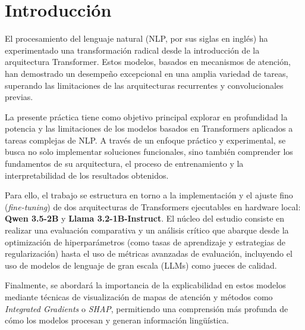 \section{Introducción}

El procesamiento del lenguaje natural (NLP, por sus siglas en inglés) ha experimentado una transformación radical desde la introducción de la arquitectura Transformer. Estos modelos, basados en mecanismos de atención, han demostrado un desempeño excepcional en una amplia variedad de tareas, superando las limitaciones de las arquitecturas recurrentes y convolucionales previas.

La presente práctica tiene como objetivo principal explorar en profundidad la potencia y las limitaciones de los modelos basados en Transformers aplicados a tareas complejas de NLP. A través de un enfoque práctico y experimental, se busca no solo implementar soluciones funcionales, sino también comprender los fundamentos de su arquitectura, el proceso de entrenamiento y la interpretabilidad de los resultados obtenidos.

Para ello, el trabajo se estructura en torno a la implementación y el ajuste fino (\textit{fine-tuning}) de dos arquitecturas de Transformers ejecutables en hardware local: \textbf{Qwen 3.5-2B} y \textbf{Llama 3.2-1B-Instruct}. El núcleo del estudio consiste en realizar una evaluación comparativa y un análisis crítico que abarque desde la optimización de hiperparámetros (como tasas de aprendizaje y estrategias de regularización) hasta el uso de métricas avanzadas de evaluación, incluyendo el uso de modelos de lenguaje de gran escala (LLMs) como jueces de calidad.

Finalmente, se abordará la importancia de la explicabilidad en estos modelos mediante técnicas de visualización de mapas de atención y métodos como \textit{Integrated Gradients} o \textit{SHAP}, permitiendo una comprensión más profunda de cómo los modelos procesan y generan información lingüística.
